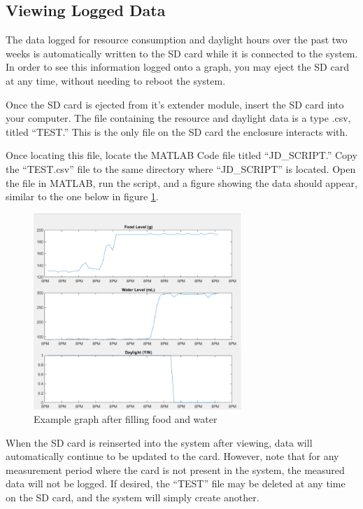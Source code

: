 \documentclass{article}
\begin{document}
\subsection{Viewing Logged Data}
The data logged for resource consumption and daylight hours over the past two weeks is automatically written to the SD card while it is connected to the system. In order to see this information logged onto a graph, you may eject the SD card at any time, without needing to reboot the system.

Once the SD card is ejected from it’s extender module, insert the SD card into your computer. The file containing the resource and daylight data is a type .csv, titled “TEST.” This is the only file on the SD card the enclosure interacts with.

Once locating this file, locate the MATLAB Code file titled “JD\_SCRIPT.” Copy the “TEST.csv” file to the same directory where “JD\_SCRIPT” is located. Open the file in MATLAB, run the script, and a figure showing the data should appear, similar to the one below in figure \ref{fig:example-graph}.

\begin{figure}[H]
    \centering
    \includegraphics[width=0.7\textwidth]{fig/example-graph.png}
    \caption{Example graph after filling food and water}
    \label{fig:example-graph}
\end{figure}

When the SD card is reinserted into the system after viewing, data will automatically continue to be updated to the card. However, note that for any measurement period where the card is not present in the system, the measured data will not be logged. If desired, the “TEST” file may be deleted at any time on the SD card, and the system will simply create another.
\newpage
\end{document}
